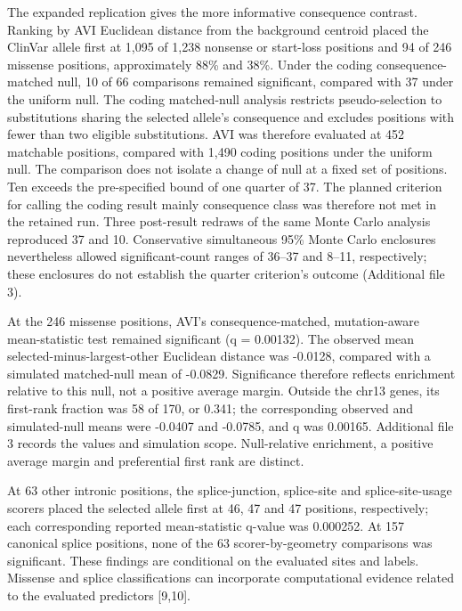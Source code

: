 \documentclass[
  11pt,
]{article}
\begin{document}
The expanded replication gives the more informative consequence
contrast. Ranking by AVI Euclidean distance from the background centroid
placed the ClinVar allele first at 1,095 of 1,238 nonsense or start-loss
positions and 94 of 246 missense positions, approximately 88\% and 38\%.
Under the coding consequence-matched null, 10 of 66 comparisons remained
significant, compared with 37 under the uniform null. The coding
matched-null analysis restricts pseudo-selection to substitutions
sharing the selected allele's consequence and excludes positions with
fewer than two eligible substitutions. AVI was therefore evaluated at
452 matchable positions, compared with 1,490 coding positions under the
uniform null. The comparison does not isolate a change of null at a
fixed set of positions. Ten exceeds the pre-specified bound of one
quarter of 37. The planned criterion for calling the coding result
mainly consequence class was therefore not met in the retained run.
Three post-result redraws of the same Monte Carlo analysis reproduced 37
and 10. Conservative simultaneous 95\% Monte Carlo enclosures
nevertheless allowed significant-count ranges of 36--37 and 8--11,
respectively; these enclosures do not establish the quarter criterion's
outcome (Additional file 3).

At the 246 missense positions, AVI's consequence-matched, mutation-aware
mean-statistic test remained significant (q = 0.00132). The observed
mean selected-minus-largest-other Euclidean distance was -0.0128,
compared with a simulated matched-null mean of -0.0829. Significance
therefore reflects enrichment relative to this null, not a positive
average margin. Outside the chr13 genes, its first-rank fraction was 58
of 170, or 0.341; the corresponding observed and simulated-null means
were -0.0407 and -0.0785, and q was 0.00165. Additional file 3 records
the values and simulation scope. Null-relative enrichment, a positive
average margin and preferential first rank are distinct.

At 63 other intronic positions, the splice-junction, splice-site and
splice-site-usage scorers placed the selected allele first at 46, 47 and
47 positions, respectively; each corresponding reported mean-statistic
q-value was 0.000252. At 157 canonical splice positions, none of the 63
scorer-by-geometry comparisons was significant. These findings are
conditional on the evaluated sites and labels. Missense and splice
classifications can incorporate computational evidence related to the
evaluated predictors {[}9,10{]}.
\end{document}
